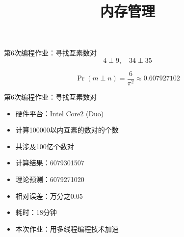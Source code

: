 \documentclass[xcolor=svgnames]{beamer}
\begin{document}
\begin{CJK*}{UTF8}{gbsn}


\title{内存管理}


\begin{frame}{第6次编程作业：寻找互素数对}
\begin{equation}
4 \perp 9, \quad 34 \perp 35
\end{equation}

\begin{equation}
\Pr(m \perp n) = \frac{6}{\pi^2} \approx 0.607927102
\end{equation}

\end{frame}

\begin{frame}{第6次编程作业：寻找互素数对}
\begin{itemize}
\item 硬件平台：Intel Core2 (Duo)
\item 计算100000以内互素的数对的个数
\item 共涉及100亿个数对
\item 计算结果：6079301507
\item 理论预测：6079271020
\item 相对误差：万分之0.05
\item 耗时：18分钟
\item 本次作业：用多线程编程技术加速
\end{itemize}
\end{frame}


\end{CJK*}
\end{document}
